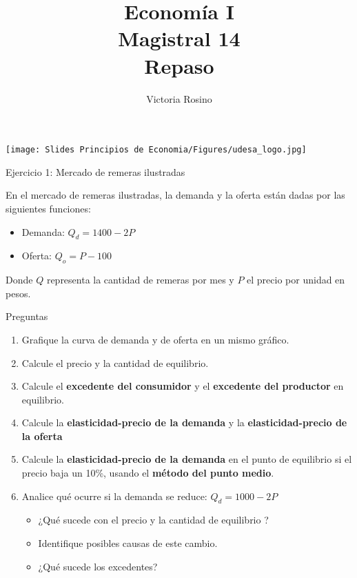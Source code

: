 \documentclass{beamer}
\title[Economía I]{Economía I \vspace{3mm}
\\ Magistral 14 \vspace{3mm} \\ Repaso}
\date{}
\author[Victoria Rosino]{Victoria Rosino}
\institute[]{Universidad de San Andrés}
\begin{document}
\begin{frame}
\vspace{0.3cm}
\titlepage
\centering
\vspace{-0.9cm}
\texttt{[image: Slides Principios de Economia/Figures/udesa\_logo.jpg]} 
\end{frame}



\begin{frame}{Ejercicio 1: Mercado de remeras ilustradas}

En el mercado de remeras ilustradas, la demanda y la oferta están dadas por las siguientes funciones:

\begin{itemize}
    \item Demanda: $Q_d = 1400 - 2P$
    \item Oferta: $Q_o = P-100$
\end{itemize}

Donde $Q$ representa la cantidad de remeras por mes y $P$ el precio por unidad en pesos.
\end{frame}

\begin{frame}{Preguntas}

\begin{enumerate}
    \item Grafique la curva de demanda y de oferta en un mismo gráfico.
    \item Calcule el precio y la cantidad de equilibrio.
    \item Calcule el \textbf{excedente del consumidor} y el \textbf{excedente del productor} en equilibrio.
    \item Calcule la \textbf{elasticidad-precio de la demanda} y la \textbf{elasticidad-precio de la oferta} 
    \item Calcule la \textbf{elasticidad-precio de la demanda} en el punto de equilibrio si el precio baja un 10\%, usando el \textbf{método del punto medio}.
    \item Analice qué ocurre si la demanda se reduce: $Q_d = 1000 - 2P$ 
        \begin{itemize}
            \item  ¿Qué sucede con el precio y la cantidad de equilibrio ? 
            \item Identifique posibles causas de este cambio.
            \item ¿Qué sucede los excedentes? 
        \end{itemize}
\end{enumerate}
\end{frame}
\end{document}
